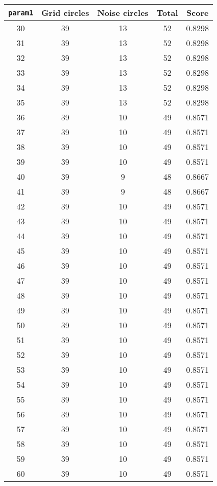 \documentclass[letterpaper, 12pt]{article}
\begin{document}
\begin{longtable}{|c|c|c|c|c|}
\hline
\textbf{\texttt{param1}} & \textbf{Grid circles} & \textbf{Noise circles} & \textbf{Total} & \textbf{Score} \\
\hline
30 & 39 & 13 & 52 & 0.8298 \\
\hline
31 & 39 & 13 & 52 & 0.8298 \\
\hline
32 & 39 & 13 & 52 & 0.8298 \\
\hline
33 & 39 & 13 & 52 & 0.8298 \\
\hline
34 & 39 & 13 & 52 & 0.8298 \\
\hline
35 & 39 & 13 & 52 & 0.8298 \\
\hline
36 & 39 & 10 & 49 & 0.8571 \\
\hline
37 & 39 & 10 & 49 & 0.8571 \\
\hline
38 & 39 & 10 & 49 & 0.8571 \\
\hline
39 & 39 & 10 & 49 & 0.8571 \\
\hline
40 & 39 & 9 & 48 & 0.8667 \\
\hline
41 & 39 & 9 & 48 & 0.8667 \\
\hline
42 & 39 & 10 & 49 & 0.8571 \\
\hline
43 & 39 & 10 & 49 & 0.8571 \\
\hline
44 & 39 & 10 & 49 & 0.8571 \\
\hline
45 & 39 & 10 & 49 & 0.8571 \\
\hline
46 & 39 & 10 & 49 & 0.8571 \\
\hline
47 & 39 & 10 & 49 & 0.8571 \\
\hline
48 & 39 & 10 & 49 & 0.8571 \\
\hline
49 & 39 & 10 & 49 & 0.8571 \\
\hline
50 & 39 & 10 & 49 & 0.8571 \\
\hline
51 & 39 & 10 & 49 & 0.8571 \\
\hline
52 & 39 & 10 & 49 & 0.8571 \\
\hline
53 & 39 & 10 & 49 & 0.8571 \\
\hline
54 & 39 & 10 & 49 & 0.8571 \\
\hline
55 & 39 & 10 & 49 & 0.8571 \\
\hline
56 & 39 & 10 & 49 & 0.8571 \\
\hline
57 & 39 & 10 & 49 & 0.8571 \\
\hline
58 & 39 & 10 & 49 & 0.8571 \\
\hline
59 & 39 & 10 & 49 & 0.8571 \\
\hline
60 & 39 & 10 & 49 & 0.8571 \\

\end{longtable}
\end{document}

